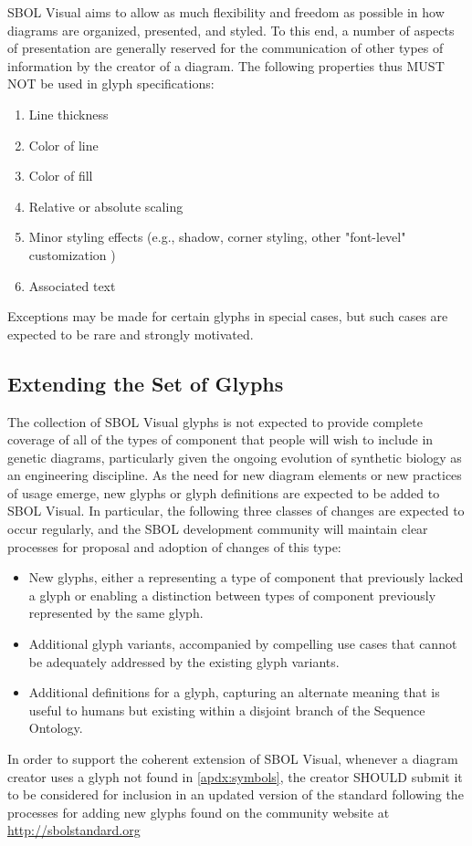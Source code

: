 SBOL Visual aims to allow as much flexibility and freedom as possible in how diagrams are organized, presented, and styled.
%
To this end, a number of aspects of presentation are generally reserved for the communication of other types of information by the creator of a diagram.
%
The following properties thus MUST NOT be used in glyph specifications:
\begin{enumerate}
\item Line thickness
\item Color of line
\item Color of fill
\item Relative or absolute scaling
\item Minor styling effects (e.g., shadow, corner styling, other "font-level" customization )
\item Associated text
\end{enumerate}
Exceptions may be made for certain glyphs in special cases, but such cases are expected to be rare and strongly motivated.



\subsection{Extending the Set of Glyphs}\label{sec:extension}
The collection of SBOL Visual glyphs is not expected to provide
complete coverage of all of the types of component that people will
wish to include in genetic diagrams, particularly given the ongoing
evolution of synthetic biology as an engineering discipline.
%
As the need for new diagram elements or new practices of usage emerge,
new glyphs or glyph definitions are expected to be added to SBOL
Visual.
%
In particular, the following three classes of changes are expected to occur regularly,
and the SBOL development community will maintain clear processes for
proposal and adoption of changes of this type:
\begin{itemize}
\item New glyphs, either a representing a type of component that
  previously lacked a glyph or enabling a distinction between types of
  component previously represented by the same glyph.
\item Additional glyph variants, accompanied by compelling use cases
  that cannot be adequately addressed by the existing glyph variants.
\item Additional definitions for a glyph, capturing an alternate
  meaning that is useful to humans but existing within a disjoint
  branch of the Sequence Ontology.
\end{itemize}

In order to support the coherent extension of SBOL Visual, 
whenever a diagram creator uses a glyph not found in \ref{apdx:symbols}, 
the creator SHOULD submit it to be considered for inclusion in an updated version of the standard following the processes for adding new glyphs found on the community website at \url{http://sbolstandard.org}



